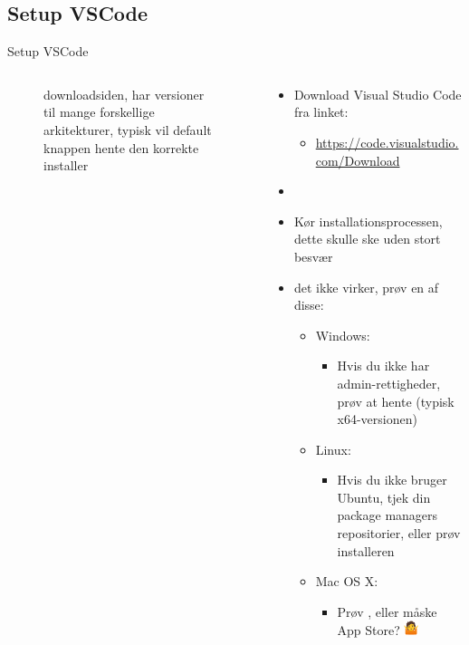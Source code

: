 \documentclass[aspectratio=169]{beamer}
\begin{document}
\subsection{Setup VSCode}
\begin{frame}{Setup VSCode}
\begin{columns}
	\begin{column}{0.5\textwidth}
		\begin{figure}
  			\caption{ downloadsiden, har versioner til mange forskellige arkitekturer, typisk vil default knappen hente den korrekte installer}
  			\label{fig:vscode-dl}
		\end{figure}
	\end{column}
	\begin{column}{0.5\textwidth}
		\begin{textBox}
			\begin{itemize}
				\item Download Visual Studio Code fra linket:
				\begin{itemize}
					 \item \small\url{https://code.visualstudio.com/Download}
				\end{itemize}
				\item {}
				\item Kør installationsprocessen, dette skulle ske uden stort besvær
				\item {} det ikke virker, prøv en af disse:
				\begin{itemize}
					\item Windows:
					\begin{itemize}
						\item Hvis du ikke har admin-rettigheder, prøv at hente  (typisk x64-versionen)
					\end{itemize}
					\item Linux:
					\begin{itemize}
						\item Hvis du ikke bruger Ubuntu, tjek din package managers repositorier, eller prøv  installeren
					\end{itemize}
					\item Mac OS X:
					\begin{itemize}
						\item Prøv , eller måske App Store?  \includegraphics[height=12pt, keepaspectratio=true]{assets/pictures/shrug.png}
					\end{itemize}
				\end{itemize}
			\end{itemize}
		\end{textBox}
	\end{column}
\end{columns}
\end{frame}
\end{document}
